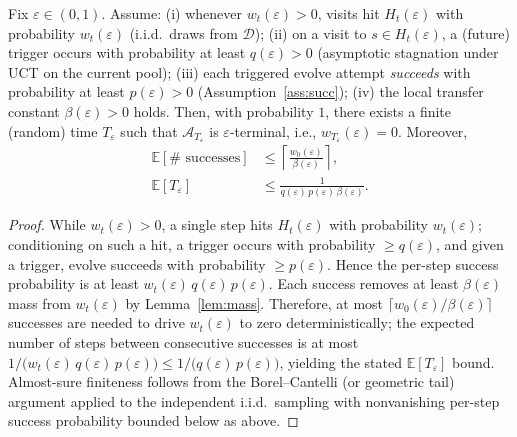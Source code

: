 \begin{theorem}
\label{thm:terminality}
Fix $\varepsilon\in(0,1)$. Assume:
(i) whenever $w_t(\varepsilon)>0$, visits hit $H_t(\varepsilon)$ with probability $w_t(\varepsilon)$ (i.i.d.\ draws from $\mathcal D$);
(ii) on a visit to $s\in H_t(\varepsilon)$, a (future) trigger occurs with probability at least $q(\varepsilon)>0$ (asymptotic stagnation under UCT on the current pool); 
(iii) each triggered evolve attempt \emph{succeeds} with probability at least $p(\varepsilon)>0$ (Assumption~\ref{ass:succ});
(iv) the local transfer constant $\beta(\varepsilon)>0$ holds. Then, with probability $1$, there exists a finite (random) time $T_\varepsilon$ such that $\mathcal A_{T_\varepsilon}$ is $\varepsilon$-terminal, i.e., $w_{T_\varepsilon}(\varepsilon)=0$. Moreover,
\[
\begin{aligned}
\mathbb E[\#\text{ successes}]
&\le \left\lceil \frac{w_0(\varepsilon)}{\beta(\varepsilon)}\right\rceil,\\
\mathbb E[T_\varepsilon]
&\le \frac{1}{q(\varepsilon)\,p(\varepsilon)\,\beta(\varepsilon)}.
\end{aligned}
\]
\end{theorem}

\begin{proof}
While $w_t(\varepsilon)>0$, a single step hits $H_t(\varepsilon)$ with probability $w_t(\varepsilon)$; conditioning on such a hit, a trigger occurs with probability $\ge q(\varepsilon)$, and given a trigger, evolve succeeds with probability $\ge p(\varepsilon)$. Hence the per-step success probability is at least $w_t(\varepsilon)\,q(\varepsilon)\,p(\varepsilon)$. 
Each success removes at least $\beta(\varepsilon)$ mass from $w_t(\varepsilon)$ by Lemma~\ref{lem:mass}. Therefore, at most $\lceil w_0(\varepsilon)/\beta(\varepsilon)\rceil$ successes are needed to drive $w_t(\varepsilon)$ to zero deterministically; the expected number of steps between consecutive successes is at most $1/\big(w_t(\varepsilon)\,q(\varepsilon)\,p(\varepsilon)\big)\le 1/\big(q(\varepsilon)\,p(\varepsilon)\big)$, yielding the stated $\mathbb E[T_\varepsilon]$ bound. Almost-sure finiteness follows from the Borel--Cantelli (or geometric tail) argument applied to the independent i.i.d.\ sampling with nonvanishing per-step success probability bounded below as above.
\end{proof}

